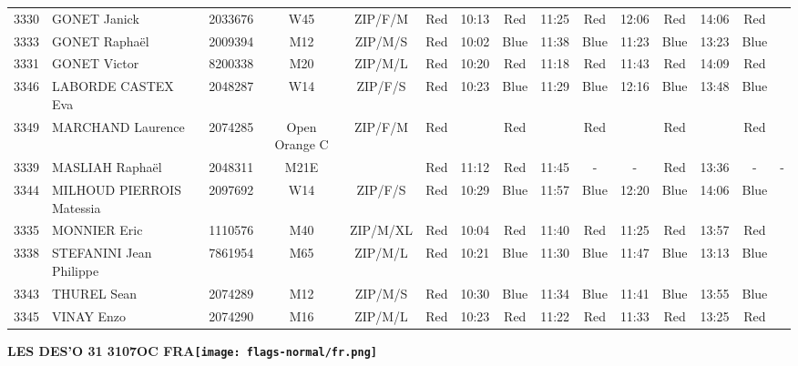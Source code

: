 \documentclass{report}
\begin{document}
\begin{longtable}{|c|l|r|c|c|*{5}{cc|}}
    3330 & GONET Janick & 2033676 & W45 & ZIP/F/M & Red & 10:13 & Red & 11:25 & Red & 12:06 & Red & 14:06 & Red &  \\
    3333 & GONET Raphaël & 2009394 & M12 & ZIP/M/S & Red & 10:02 & Blue & 11:38 & Blue & 11:23 & Blue & 13:23 & Blue &  \\
    3331 & GONET Victor & 8200338 & M20 & ZIP/M/L & Red & 10:20 & Red & 11:18 & Red & 11:43 & Red & 14:09 & Red &  \\
    3346 & LABORDE CASTEX Eva & 2048287 & W14 & ZIP/F/S & Red & 10:23 & Blue & 11:29 & Blue & 12:16 & Blue & 13:48 & Blue &  \\
    3349 & MARCHAND Laurence & 2074285 & Open Orange C & ZIP/F/M & Red &   & Red &   & Red &   & Red &   & Red &  \\
    3339 & MASLIAH Raphaël & 2048311 & M21E &   & Red & 11:12 & Red & 11:45 & - &  - & Red & 13:36 & - &  -\\
    3344 & MILHOUD PIERROIS Matessia & 2097692 & W14 & ZIP/F/S & Red & 10:29 & Blue & 11:57 & Blue & 12:20 & Blue & 14:06 & Blue &  \\
    3335 & MONNIER Eric & 1110576 & M40 & ZIP/M/XL & Red & 10:04 & Red & 11:40 & Red & 11:25 & Red & 13:57 & Red &  \\
    3338 & STEFANINI Jean Philippe & 7861954 & M65 & ZIP/M/L & Red & 10:21 & Blue & 11:30 & Blue & 11:47 & Blue & 13:13 & Blue &  \\
    3343 & THUREL Sean & 2074289 & M12 & ZIP/M/S & Red & 10:30 & Blue & 11:34 & Blue & 11:41 & Blue & 13:55 & Blue &  \\
    3345 & VINAY Enzo & 2074290 & M16 & ZIP/M/L & Red & 10:23 & Red & 11:22 & Red & 11:33 & Red & 13:25 & Red &  \\
  \end{longtable}
\newpage
  \Huge \centering \bfseries LES DES'O 31 3107OC FRA\normalfont \footnotesize \sffamily \hfill \texttt{[image: flags-normal/fr.png]} \newline 
\end{document}
